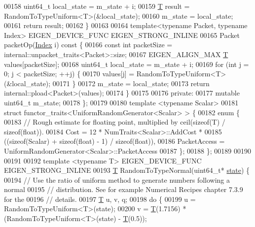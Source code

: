\begin{DoxyCode}
00158     uint64\_t local\_state = m\_state + i;
00159     \hyperlink{group___sparse_core___module_class_eigen_1_1_triplet}{T} result = RandomToTypeUniform<T>(&local\_state);
00160     m\_state = local\_state;
00161     \textcolor{keywordflow}{return} result;
00162   \}
00163 
00164   \textcolor{keyword}{template}<\textcolor{keyword}{typename} Packet, \textcolor{keyword}{typename} Index> EIGEN\_DEVICE\_FUNC EIGEN\_STRONG\_INLINE
00165   Packet packetOp(\hyperlink{namespace_eigen_a62e77e0933482dafde8fe197d9a2cfde}{Index} i)\textcolor{keyword}{ const }\{
00166     \textcolor{keyword}{const} \textcolor{keywordtype}{int} packetSize = internal::unpacket\_traits<Packet>::size;
00167     EIGEN\_ALIGN\_MAX \hyperlink{group___sparse_core___module_class_eigen_1_1_triplet}{T} values[packetSize];
00168     uint64\_t local\_state = m\_state + i;
00169     \textcolor{keywordflow}{for} (\textcolor{keywordtype}{int} j = 0; j < packetSize; ++j) \{
00170       values[j] = RandomToTypeUniform<T>(&local\_state);
00171     \}
00172     m\_state = local\_state;
00173     \textcolor{keywordflow}{return} internal::pload<Packet>(values);
00174   \}
00175 
00176  \textcolor{keyword}{private}:
00177   \textcolor{keyword}{mutable} uint64\_t m\_state;
00178 \};
00179 
00180 \textcolor{keyword}{template} <\textcolor{keyword}{typename} Scalar>
00181 \textcolor{keyword}{struct }functor\_traits<UniformRandomGenerator<Scalar> > \{
00182   \textcolor{keyword}{enum} \{
00183     \textcolor{comment}{// Rough estimate for floating point, multiplied by ceil(sizeof(T) / sizeof(float)).}
00184     Cost = 12 * NumTraits<Scalar>::AddCost *
00185            ((\textcolor{keyword}{sizeof}(Scalar) + \textcolor{keyword}{sizeof}(\textcolor{keywordtype}{float}) - 1) / \textcolor{keyword}{sizeof}(\textcolor{keywordtype}{float})),
00186     PacketAccess = UniformRandomGenerator<Scalar>::PacketAccess
00187   \};
00188 \};
00189 
00190 
00191 
00192 \textcolor{keyword}{template} <\textcolor{keyword}{typename} T> EIGEN\_DEVICE\_FUNC EIGEN\_STRONG\_INLINE
00193 \hyperlink{group___sparse_core___module_class_eigen_1_1_triplet}{T} RandomToTypeNormal(uint64\_t* \hyperlink{structstate}{state}) \{
00194   \textcolor{comment}{// Use the ratio of uniform method to generate numbers following a normal}
00195   \textcolor{comment}{// distribution. See for example Numerical Recipes chapter 7.3.9 for the}
00196   \textcolor{comment}{// details.}
00197   \hyperlink{group___sparse_core___module_class_eigen_1_1_triplet}{T} u, v, q;
00198   \textcolor{keywordflow}{do} \{
00199     u = RandomToTypeUniform<T>(state);
00200     v = \hyperlink{group___sparse_core___module_class_eigen_1_1_triplet}{T}(1.7156) * (RandomToTypeUniform<T>(state) - \hyperlink{group___sparse_core___module_class_eigen_1_1_triplet}{T}(0.5));

\end{DoxyCode}
